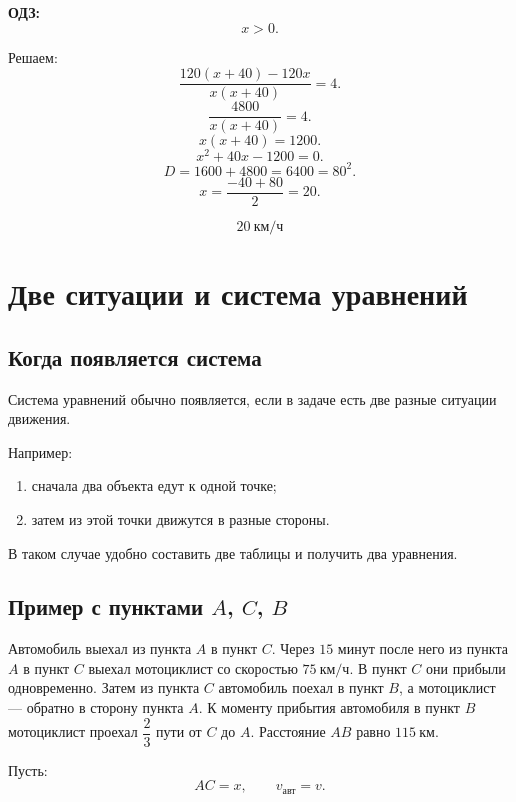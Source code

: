 \documentclass[a4paper,12pt]{article}
\newcommand{\important}[1]{\textcolor{darkaccent}{\textbf{#1}}}
\newcommand{\kmh}{\text{км/ч}}
\newcommand{\km}{\text{км}}
\begin{document}
\important{ОДЗ:}
\[
x>0.
\]

Решаем:
\[
\frac{120(x+40)-120x}{x(x+40)}=4.
\]
\[
\frac{4800}{x(x+40)}=4.
\]
\[
x(x+40)=1200.
\]
\[
x^2+40x-1200=0.
\]
\[
D=1600+4800=6400=80^2.
\]
\[
x=\frac{-40+80}{2}=20.
\]

\[
\boxed{20\ \kmh}
\]

\section{Две ситуации и система уравнений}

\subsection{Когда появляется система}

Система уравнений обычно появляется, если в задаче есть две разные ситуации движения.

Например:

\begin{enumerate}
    \item сначала два объекта едут к одной точке;
    \item затем из этой точки движутся в разные стороны.
\end{enumerate}

В таком случае удобно составить две таблицы и получить два уравнения.

\subsection{Пример с пунктами $A$, $C$, $B$}

Автомобиль выехал из пункта $A$ в пункт $C$. Через $15$ минут после него из пункта $A$ в пункт $C$ выехал мотоциклист со скоростью $75\ \kmh$. В пункт $C$ они прибыли одновременно. Затем из пункта $C$ автомобиль поехал в пункт $B$, а мотоциклист --- обратно в сторону пункта $A$. К моменту прибытия автомобиля в пункт $B$ мотоциклист проехал $\dfrac{2}{3}$ пути от $C$ до $A$. Расстояние $AB$ равно $115\ \km$.

Пусть:
\[
AC=x, \qquad v_{\text{авт}}=v.
\]

\begin{center}
\end{center}
\end{document}
